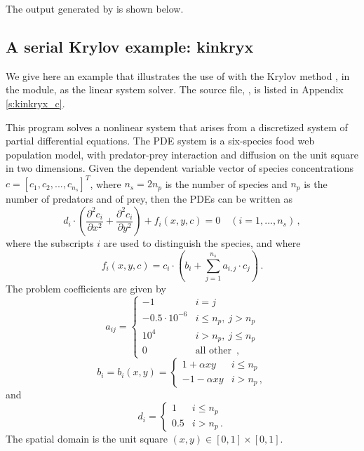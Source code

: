 The output generated by  is shown below.




\subsection{A serial Krylov example: kinkryx}\label{ss:kinkryx}

We give here an example that illustrates the use of {\kinsol} with the Krylov
method {\spgmr}, in the {\kinspgmr} module, as the linear system solver.
The source file, , is listed in Appendix \ref{s:kinkryx_c}.

This program solves a nonlinear system that arises from a discretized system of partial
differential equations. The PDE system is a six-species food web population
model, with predator-prey interaction and diffusion on the unit square in
two dimensions. Given the dependent variable vector of species concentrations
$c = [c_1, c_2,..., c_{n_s}]^T$, where $n_s = 2 n_p$ is the number of species 
and $n_p$ is the number of predators and of prey, then
the PDEs can be written as
\begin{equation}\label{e:kinkryx_pde}
  d_i \cdot \left( \frac{\partial^2 c_i}{\partial x^2} + 
    \frac{\partial^2 c_i}{\partial y^2} \right) + f_i(x,y,c) = 0
  \quad (i=1,...,n_s) \, ,
\end{equation}
where the subscripts $i$ are used to distinguish the species, and where
\begin{equation}\label{e:kinkryx_fterm}
f_i(x,y,c) = c_i \cdot \left(b_i + \sum_{j=1}^{n_s} a_{i,j} \cdot c_j \right) \, .
\end{equation}
The problem coefficients are given by
\begin{equation*}
  a_{ij} = 
  \begin{cases}
    -1                 & i=j \\
    -0.5 \cdot 10^{-6} & i \leq n_p , ~ j > n_p  \\
    10^4               & i > n_p , ~ j \leq n_p  \\
    0                  & \mbox{all other } \, ,
  \end{cases}
\end{equation*}
\begin{equation*}
  b_i = b_i(x,y) = 
  \begin{cases}
    1 + \alpha xy   & i \leq n_p  \\
    -1 - \alpha xy   & i > n_p \, ,
  \end{cases}
\end{equation*}
and
\begin{equation*}
  d_i = 
  \begin{cases}
    1 & i \leq n_p  \\
    0.5 & i > n_p  \, .
  \end{cases}
\end{equation*}
The spatial domain is the unit square $(x,y) \in [0,1] \times [0,1]$.

